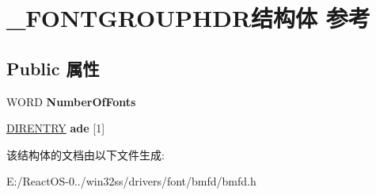 \hypertarget{struct___f_o_n_t_g_r_o_u_p_h_d_r}{}\section{\+\_\+\+F\+O\+N\+T\+G\+R\+O\+U\+P\+H\+D\+R结构体 参考}
\label{struct___f_o_n_t_g_r_o_u_p_h_d_r}
\subsection*{Public 属性}
\begin{DoxyCompactItemize}
\item 
\mbox{\label{struct___f_o_n_t_g_r_o_u_p_h_d_r_a99e368ce7d221f094facbe8516cfd71f}} 
W\+O\+RD {\bfseries Number\+Of\+Fonts}
\item 
\mbox{\label{struct___f_o_n_t_g_r_o_u_p_h_d_r_ab26528681bb6d67ac9973fb70e65106a}} 
\hyperlink{struct_d_i_r_e_n_t_r_y}{D\+I\+R\+E\+N\+T\+RY} {\bfseries ade} \mbox{[}1\mbox{]}
\end{DoxyCompactItemize}


该结构体的文档由以下文件生成\+:\begin{DoxyCompactItemize}
\item 
E\+:/\+React\+O\+S-\/0../win32ss/drivers/font/bmfd/bmfd.\+h\end{DoxyCompactItemize}
